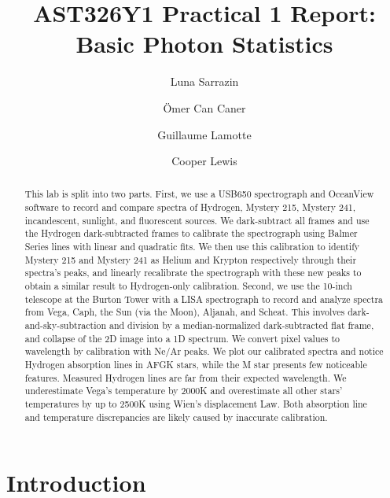\documentclass[twocolumn]{aastex702}
\begin{document}
\title{AST326Y1 Practical 1 Report: Basic Photon Statistics}

\author{Luna Sarrazin}

\author{Ömer Can Caner}

\author{Guillaume Lamotte}

\author{Cooper Lewis}

	\begin{abstract}
		This lab is split into two parts. First, we use a USB650 spectrograph and OceanView software to record and compare spectra of Hydrogen, Mystery 215, Mystery 241, incandescent, sunlight, and fluorescent sources. We dark-subtract all frames and use the Hydrogen dark-subtracted frames to calibrate the spectrograph using Balmer Series lines with linear and quadratic fits. We then use this calibration to identify Mystery 215 and Mystery 241 as Helium and Krypton respectively through their spectra's peaks, and linearly recalibrate the spectrograph with these new peaks to obtain a similar result to Hydrogen-only calibration. Second, we use the 10-inch telescope at the Burton Tower with a LISA spectrograph to record and analyze spectra from Vega, Caph, the Sun (via the Moon), Aljanah, and Scheat. This involves dark-and-sky-subtraction and division by a median-normalized dark-subtracted flat frame, and collapse of the 2D image into a 1D spectrum. We convert pixel values to wavelength by calibration with Ne/Ar peaks. We plot our calibrated spectra and notice Hydrogen absorption lines in AFGK stars, while the M star presents few noticeable features. Measured Hydrogen lines are far from their expected wavelength. We underestimate Vega's temperature by 2000K and overestimate all other stars' temperatures by up to 2500K using Wien's displacement Law. Both absorption line and temperature discrepancies are likely caused by inaccurate calibration.
	\end{abstract}

	\section{Introduction}\label{sec:intro}
\end{document}
